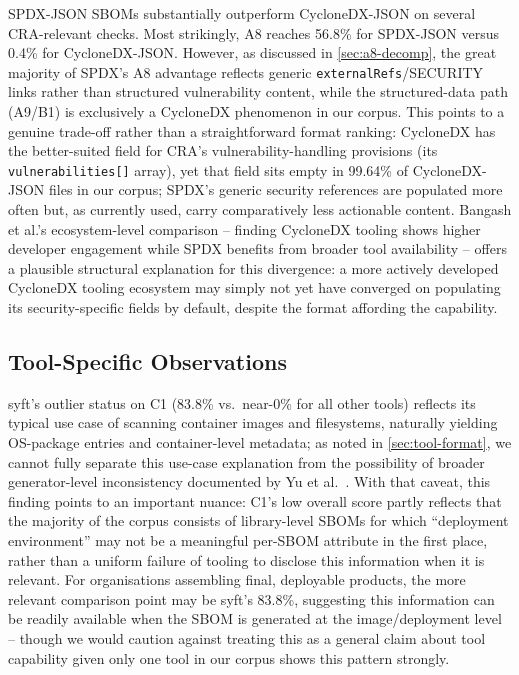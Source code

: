 \documentclass[11pt]{article}
\begin{document}
SPDX-JSON SBOMs substantially outperform CycloneDX-JSON on several CRA-relevant checks. Most strikingly, A8 reaches 56.8\% for SPDX-JSON versus 0.4\% for CycloneDX-JSON. However, as discussed in \cref{sec:a8-decomp}, the great majority of SPDX's A8 advantage reflects generic \texttt{externalRefs}/SECURITY links rather than structured vulnerability content, while the structured-data path (A9/B1) is exclusively a CycloneDX phenomenon in our corpus. This points to a genuine trade-off rather than a straightforward format ranking: CycloneDX has the better-suited field for CRA's vulnerability-handling provisions (its \texttt{vulnerabilities[]} array), yet that field sits empty in 99.64\% of CycloneDX-JSON files in our corpus; SPDX's generic security references are populated more often but, as currently used, carry comparatively less actionable content. Bangash et al.'s \cite{bangash2026} ecosystem-level comparison -- finding CycloneDX tooling shows higher developer engagement while SPDX benefits from broader tool availability -- offers a plausible structural explanation for this divergence: a more actively developed CycloneDX tooling ecosystem may simply not yet have converged on populating its security-specific fields by default, despite the format affording the capability.

\subsection{Tool-Specific Observations}

syft's outlier status on C1 (83.8\% vs.\ near-0\% for all other tools) reflects its typical use case of scanning container images and filesystems, naturally yielding OS-package entries and container-level metadata; as noted in \cref{sec:tool-format}, we cannot fully separate this use-case explanation from the possibility of broader generator-level inconsistency documented by Yu et al.\ \cite{yu2024}. With that caveat, this finding points to an important nuance: C1's low overall score partly reflects that the majority of the corpus consists of library-level SBOMs for which ``deployment environment'' may not be a meaningful per-SBOM attribute in the first place, rather than a uniform failure of tooling to disclose this information when it is relevant. For organisations assembling final, deployable products, the more relevant comparison point may be syft's 83.8\%, suggesting this information can be readily available when the SBOM is generated at the image/deployment level -- though we would caution against treating this as a general claim about tool capability given only one tool in our corpus shows this pattern strongly.
\end{document}

